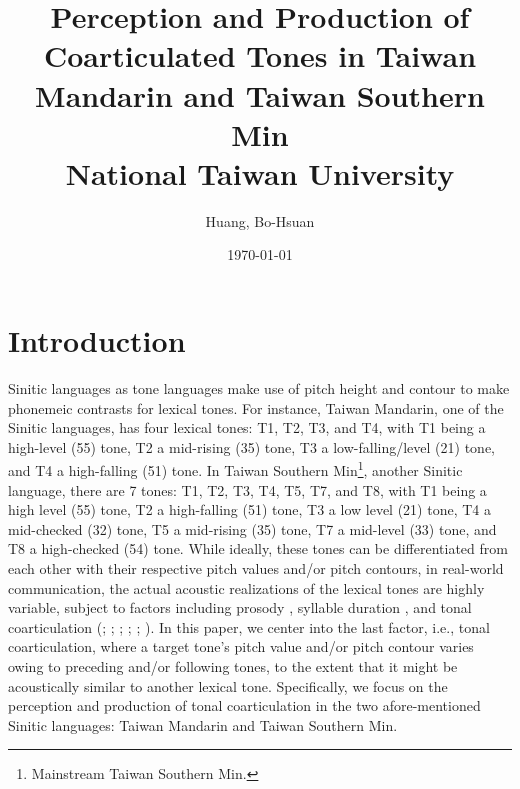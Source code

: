 \documentclass[12pt]{report}
\title{
{Perception and Production of Coarticulated Tones in Taiwan Mandarin and Taiwan Southern Min}\\
{\large National Taiwan University}
}
\author{Huang, Bo-Hsuan}
\date{\today}
\begin{document}
\large
\noautomath
\begin{CJK}{UTF8}{bsmi}

\begin{titlepage}
   \begin{center}
       \vspace*{1cm}
		\sloppy
		\let\newpage\relax\maketitle
   \end{center}
\end{titlepage}

\tableofcontents

\pagebreak
\chapter{Introduction}\label{chapter:Introduction}

Sinitic languages as tone languages make use of pitch height and contour to make phonemeic contrasts for lexical tones. For instance, Taiwan Mandarin, one of the Sinitic languages, has four lexical tones: T1, T2, T3, and T4, with T1 being a high-level (55) tone, T2 a mid-rising (35) tone, T3 a low-falling/level (21) tone, and T4 a high-falling (51) tone. In Taiwan Southern Min\footnote{Mainstream Taiwan Southern Min.}, another Sinitic language, there are 7 tones: T1, T2, T3, T4, T5, T7, and T8, with T1 being a high level (55) tone, T2 a high-falling (51) tone, T3 a low level (21) tone, T4 a mid-checked (32) tone, T5 a mid-rising (35) tone, T7 a mid-level (33) tone, and T8 a high-checked (54) tone. While ideally, these tones can be differentiated from each other with their respective pitch values and/or pitch contours, in real-world communication, the actual acoustic realizations of the lexical tones are highly variable, subject to factors including prosody \citep{Peng1997}, syllable duration \citep{XuWang2009}, and tonal coarticulation (\citealp{Shen1990}; \citealp{Xu1994}; \citealp{Peng1997}; \citeyear{Xu1997}; \citealp{Wang2002}; \citealp{ChangHsieh2012}). In this paper, we center into the last factor, i.e., tonal coarticulation, where a target tone's pitch value and/or pitch contour varies owing to preceding and/or following tones, to the extent that it might be acoustically similar to another lexical tone. Specifically, we focus on the perception and production of tonal coarticulation in the two afore-mentioned Sinitic languages: Taiwan Mandarin and Taiwan Southern Min.


\end{CJK}
\end{document}
